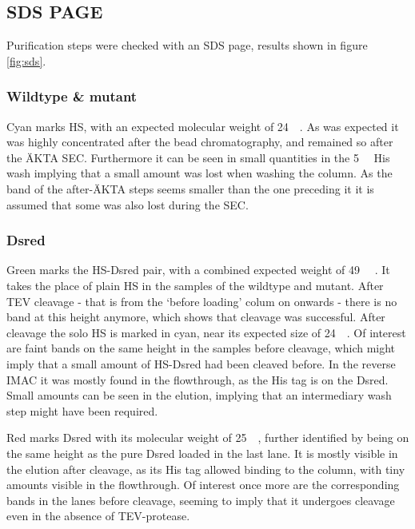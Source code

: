 \subsection{SDS PAGE}

Purification steps were checked with an SDS page, results shown in figure
\ref{fig:sds}.

\subsubsection{Wildtype \& mutant}

Cyan marks HS, with an expected molecular weight of
\SI{24}{\kilo\Da}\cite{pdb}. As was expected it was highly concentrated after
the  bead chromatography, and remained so after the ÄKTA SEC.
Furthermore it can be seen in small quantities in the \SI{5}{\milli\Molar} His
wash implying that a small amount was lost when washing the column. As the band
of the after-ÄKTA steps seems smaller than the one preceding it it is assumed
that some was also lost during the SEC.

\subsubsection{Dsred}

Green marks the HS-Dsred pair, with a combined expected weight of
\SI{49}{\kilo\Da} \cite{pdb}. It takes the place of plain HS in the samples of
the wildtype and mutant. After TEV cleavage - that is from the `before loading'
colum on onwards - there is no band at this height anymore, which shows that
cleavage was successful. After cleavage the solo HS is marked in cyan, near its
expected size of \SI{24}{\kilo\Da}. Of interest are faint bands on the same
height in the samples before cleavage, which might imply that a small amount of
HS-Dsred had been cleaved before. In the reverse IMAC it was mostly found in
the flowthrough, as the His tag is on the Dsred. Small amounts can be seen in
the elution, implying that an intermediary wash step might have been required.

Red marks Dsred with its molecular weight of \SI{25}{\kilo\Da}, further
identified by being on the same height as the pure Dsred loaded in the last
lane. It is mostly visible in the elution after cleavage, as its His tag
allowed binding to the column, with tiny amounts visible in the flowthrough. Of
interest once more are the corresponding bands in the lanes before cleavage,
seeming to imply that it undergoes cleavage even in the absence of
TEV-protease.

